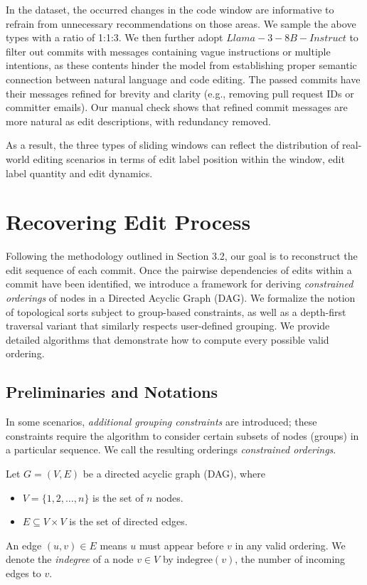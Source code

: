 In the dataset, the occurred changes in the code window are informative to refrain from unnecessary recommendations on those areas. We sample the above types with a ratio of 1:1:3. We then further adopt $Llama-3-8B-Instruct$ to filter out commits with messages containing vague instructions or multiple intentions, as these contents hinder the model from establishing proper semantic connection between natural language and code editing. The passed commits have their messages refined for brevity and clarity (e.g., removing pull request IDs or committer emails). Our manual check shows that refined commit messages are more natural as edit descriptions, with redundancy removed.

As a result, the three types of sliding windows can reflect the distribution of real-world editing scenarios in terms of edit label position within the window, edit label quantity and edit dynamics.

\section{Recovering Edit Process}

Following the methodology outlined in Section 3.2, our goal is to reconstruct the edit sequence of each commit. Once the pairwise dependencies of edits within a commit have been identified, we introduce a framework for deriving \emph{constrained orderings} of nodes in a Directed Acyclic Graph (DAG). We formalize the notion of topological sorts subject to group-based constraints, as well as a depth-first traversal variant that similarly respects user-defined grouping. We provide detailed algorithms that demonstrate how to compute every possible valid ordering.

\subsection{Preliminaries and Notations}

In some scenarios, \emph{additional grouping constraints} are introduced; these constraints require the algorithm to consider certain subsets of nodes (groups) in a particular sequence. We call the resulting orderings \emph{constrained orderings}.

Let $G = (V, E)$ be a directed acyclic graph (DAG), where
\begin{itemize}
    \item $V = \{1,2,\ldots,n\}$ is the set of $n$ nodes.
    \item $E \subseteq V \times V$ is the set of directed edges.
\end{itemize}
An edge $(u,v) \in E$ means $u$ must appear before $v$ in any valid ordering.  
We denote the \emph{indegree} of a node $v \in V$ by $\text{indegree}(v)$, the number of incoming edges to $v$.

